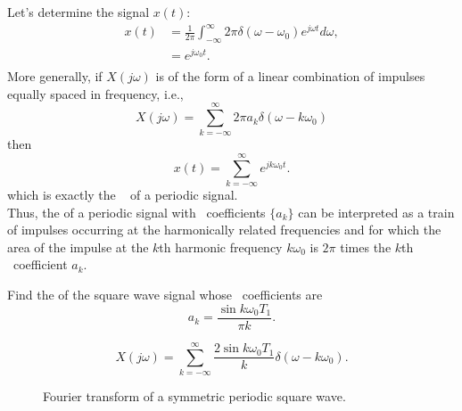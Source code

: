 \begin{frame}
    Let's determine the signal $x(t)$:
    \pause
    {
        \begin{equation*}
            \begin{split}
                x(t) &= \frac{1}{2\pi}\int_{-\infty}^{\infty} 2\pi \delta(\omega-\omega_0)e^{j\omega t} d\omega,\\
                &= e^{j\omega_0 t}.\\
            \end{split}
        \end{equation*}
        \pause
        More generally, if $X(j\omega)$ is of the form of a linear combination of impulses equally spaced in frequency, i.e.,
        \begin{equation}
             X(j\omega) = \sum_{k=-\infty}^{\infty}2\pi a_k \delta(\omega-k\omega_0)
        \end{equation}
        \pause
        then
        \begin{equation}
            x(t) = \sum_{k=-\infty}^{\infty}e^{jk\omega_0 t}.
        \end{equation}
        which is exactly the \fsr~ of a periodic signal. \\
        Thus, the \ft of a periodic signal with \fs~coefficients $\{a_k\}$ can be interpreted as a train of impulses occurring at the harmonically related frequencies and for which the area of the impulse at the $k$th harmonic frequency $k\omega_0$ is $2\pi$ times the $k$th \fs~coefficient $a_k$.
    }

\end{frame}


\begin{frame}[plain]
    \begin{example}
        Find the \ft of the square wave signal whose \fs~coefficients are
        \begin{equation*}
            a_k = \frac{\sin k \omega_0 T_1}{\pi k}.
        \end{equation*}
    \end{example}
\end{frame}


\begin{frame}[plain]
    \begin{equation*}
        X(j\omega) = \sum_{k=-\infty}^{\infty}\frac{2\sin k\omega_0 T_1}{k}\delta(\omega-k\omega_0).
    \end{equation*}
    \pause
    \begin{figure}
      \centering
      \caption{Fourier transform of a symmetric periodic square wave.}\label{fi:ft_square_wave}
    \end{figure}
\end{frame}



